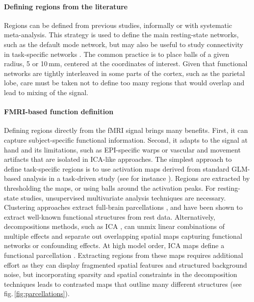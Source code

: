 \documentclass[5p]{elsarticle}
\begin{document}
\paragraph{Defining regions from the literature}
%
Regions can be defined from previous studies, informally or with
systematic meta-analysis. This strategy is used to define the main
resting-state networks, such as the default mode network, but may also be
useful to study connectivity in task-specific networks
\cite{grillon2012}. The common practice is to place balls of a given
radius, 5 or 10\,mm, centered at the coordinates of interest. Given that
functional networks are tightly interleaved in some parts of the cortex,
such as the parietal lobe, care must be taken not to define too many
regions that would overlap and lead to mixing of the signal.

\paragraph{FMRI-based function definition}
%
Defining regions directly from the fMRI signal brings many benefits.
First, it can capture subject-specific functional information. Second, it
adapts to the signal at hand and its limitations, such as
EPI-specific warps or vascular and movement artifacts that are isolated
in ICA-like approaches. The simplest approach to define task-specific
regions is to use activation maps derived from standard GLM-based
analysis in a task-driven study (see for instance \cite{poldrack2011}).
Regions are extracted by thresholding the maps, or using balls around the
activation peaks. For resting-state studies, unsupervised multivariate
analysis techniques are necessary. Clustering approaches extract
full-brain parcellations \cite{craddock2011, bellec2010, yeo2011,
thirion2006}, and have been shown to extract well-known functional
structures from rest data. Alternatively, decompositions
methods, such as ICA \cite{beckmann2004}, can unmix linear
combinations of multiple effects and separate out overlapping spatial maps
capturing functional networks or confounding effects. At high model
order, ICA maps define a functional parcellation \cite{kiviniemi2009}.
Extracting regions from these maps requires additional effort as they can
display fragmented spatial features and structured background noise, but
incorporating sparsity and spatial constraints in the decomposition
techniques leads to contrasted maps that outline many different
structures \cite{varoquaux2012} (see fig.\,\ref{fig:parcellations}).
\end{document}
